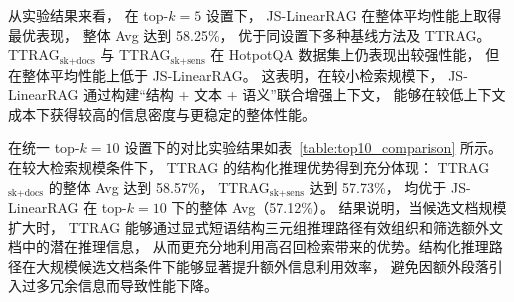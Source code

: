 从实验结果来看，
在 top-$k=5$ 设置下，
JS-LinearRAG 在整体平均性能上取得最优表现，
整体 Avg 达到 58.25\%，
优于同设置下多种基线方法及 TTRAG。
TTRAG$_{\text{sk+docs}}$ 与 TTRAG$_{\text{sk+sens}}$ 在 HotpotQA 数据集上仍表现出较强性能，
但在整体平均性能上低于 JS-LinearRAG。
这表明，在较小检索规模下，
JS-LinearRAG 通过构建“结构 + 文本 + 语义”联合增强上下文，
能够在较低上下文成本下获得较高的信息密度与更稳定的整体性能。

在统一 top-$k=10$ 设置下的对比实验结果如表~\ref{table:top10_comparison} 所示。
在较大检索规模条件下，
TTRAG 的结构化推理优势得到充分体现：
TTRAG$_{\text{sk+docs}}$ 的整体 Avg 达到 58.57\%，
TTRAG$_{\text{sk+sens}}$ 达到 57.73\%，
均优于 JS-LinearRAG 在 top-$k=10$ 下的整体 Avg（57.12\%）。
结果说明，当候选文档规模扩大时，
TTRAG 能够通过显式短语结构三元组推理路径有效组织和筛选额外文档中的潜在推理信息，
从而更充分地利用高召回检索带来的优势。结构化推理路径在大规模候选文档条件下能够显著提升额外信息利用效率，
避免因额外段落引入过多冗余信息而导致性能下降。

\begin{table}[htbp]
  \centering
  \caption{JS-LinearRAG 与 TTRAG 在 top-$k=10$ 检索设置下的性能对比}
  \label{table:top10_comparison}
  \vspace{0.5em}\centering\wuhao

\end{table}

